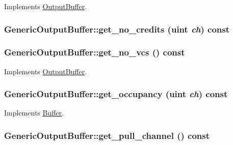 Implements \hyperlink{classOutputBuffer_45a685173b5c5cbe6270c9e0ce6d023a}{OutputBuffer}.\hypertarget{classGenericOutputBuffer_20a0a495d2b0aa4e6c6539209038ab2c}{
\subsubsection[{get\_\-no\_\-credits}]{ GenericOutputBuffer::get\_\-no\_\-credits ({\bf uint} {\em ch}) const}}
\label{classGenericOutputBuffer_20a0a495d2b0aa4e6c6539209038ab2c}


\hypertarget{classGenericOutputBuffer_6f5495e1ddd1b524d105d86b083e85cc}{
\subsubsection[{get\_\-no\_\-vcs}]{ GenericOutputBuffer::get\_\-no\_\-vcs () const}}
\label{classGenericOutputBuffer_6f5495e1ddd1b524d105d86b083e85cc}




Implements \hyperlink{classOutputBuffer_21ad5222afd999f390df4a495eb48b0a}{OutputBuffer}.\hypertarget{classGenericOutputBuffer_0b8b70b9b3ab71195eea8d0d810dce94}{
\subsubsection[{get\_\-occupancy}]{ GenericOutputBuffer::get\_\-occupancy ({\bf uint} {\em ch}) const}}
\label{classGenericOutputBuffer_0b8b70b9b3ab71195eea8d0d810dce94}




Implements \hyperlink{classBuffer_af4e2d4031945429ae58350b5897570a}{Buffer}.\hypertarget{classGenericOutputBuffer_c3e3831a4eb7b09b053b511722e89daf}{
\subsubsection[{get\_\-pull\_\-channel}]{ GenericOutputBuffer::get\_\-pull\_\-channel () const}}
\label{classGenericOutputBuffer_c3e3831a4eb7b09b053b511722e89daf}




